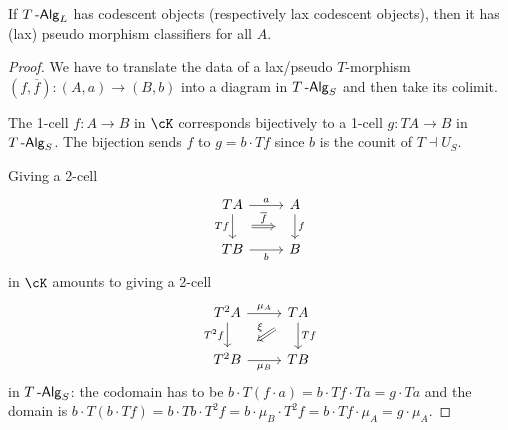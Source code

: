\documentclass[a4paper,11pt,oneside,openany]{scrbook}
\begin{document}
\begin{thm}[Lack]
    If $T\operatorname{-\mathsf{Alg}}_L$ has codescent objects (respectively lax codescent objects),
    then it has (lax) pseudo morphism classifiers for all $A$.
\end{thm}
\begin{proof}
    We have to translate the data of a lax/pseudo $T$-morphism
    $(f,\overline{f})\colon(A,a)\rightarrow(B,b)$ into a diagram in $T\operatorname{-\mathsf{Alg}}_S$
    and then take its colimit.

    The 1-cell $f\colon A\rightarrow B$ in $\cK$ corresponds bijectively to a
    1-cell $g\colon TA\rightarrow B$ in $T\operatorname{-\mathsf{Alg}}_S$. The bijection sends $f$ to
    $g=b\cdot Tf$ since $b$ is the counit of $T\dashv U_S$.

    Giving a 2-cell
    \[\begin{tikzcd}
        TA & A \\
        TB & B
        \arrow["b"', from=2-1, to=2-2]
        \arrow["a", from=1-1, to=1-2]
        \arrow[""{name=0, anchor=center, inner sep=0}, "f", from=1-2, to=2-2]
        \arrow[""{name=1, anchor=center, inner sep=0}, "Tf"', from=1-1, to=2-1]
        \arrow["{\overline{f}}", shorten <=13pt, shorten >=13pt, Rightarrow, from=1, to=0]
    \end{tikzcd}\]
    in $\cK$ amounts to giving a 2-cell
    \[\begin{tikzcd}
        {T^2A} & TA \\
        {T^2B} & TB
        \arrow["Tf", from=1-2, to=2-2]
        \arrow["{T^2f}"', from=1-1, to=2-1]
        \arrow["{\mu_B}"', from=2-1, to=2-2]
        \arrow["{\mu_A}", from=1-1, to=1-2]
        \arrow["\xi"', shorten <=8pt, shorten >=8pt, Rightarrow, from=1-2, to=2-1]
    \end{tikzcd}\]
    in $T\operatorname{-\mathsf{Alg}}_S$: the codomain has to be $b\cdot T(f\cdot a)=b\cdot Tf\cdot
    Ta=g\cdot Ta$ and the domain is $b\cdot T(b\cdot Tf)=b\cdot Tb\cdot
    T^2f=b\cdot\mu_B\cdot T^2f=b\cdot Tf\cdot\mu_A=g\cdot\mu_A$.


\end{proof}
\end{document}
